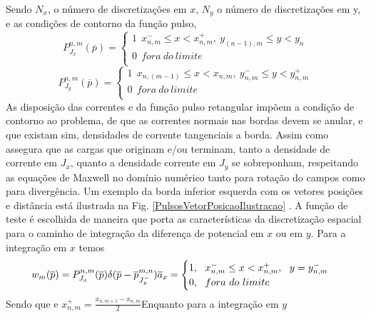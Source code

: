 \documentclass[
	12pt,				%
	openright,			%
	oneside,			%
	a4paper,			%
	english,			%
	brazil				%
	]{abntex2}
\begin{document}
\begin{apendicesenv}
\begin{figure}[htb]
\end{figure}
Sendo $N_x$, o número de discretizações em $x$, $N_y$ o número de discretizações em y, e as condições de contorno da função pulso,
\begin{equation}
     P_{J_x}^{n,m}(\overline{p})=  
     \begin{cases}
      1 \ \ x_{n,m}^{-} \leq x < x_{n,m}^{+},\ y_{(n-1),m} \leq y < y_{n}\\
      0 \ \ fora \ do \ limite \\
    \end{cases}  
\end{equation}
\begin{equation}
     P_{J_y}^{n,m}(\overline{p})=  
     \begin{cases}
      1 \ \  x_{n,(m-1)} \leq x < x_{n,m}, \ y_{n,m}^{-} \leq y < y_{n,m}^{+} \\
      0 \ \ fora \ do \ limite \\
    \end{cases}  
\end{equation}
As disposição das correntes e da função pulso retangular impõem a condição de contorno ao problema, de que as correntes normais nas bordas devem se anular, e que existam sim, densidades de corrente tangenciais a borda. Assim como assegura que as cargas que originam e/ou terminam, tanto a densidade de corrente em $J_x$, quanto a densidade corrente em $J_y$ se sobreponham, respeitando as equações de Maxwell no domínio numérico tanto para rotação do campos como para divergência. Um exemplo da borda inferior esquerda com os vetores posições e distância está ilustrada na Fig. \ref{PulsosVetorPosicaoIlustracao} . A função de teste é escolhida de maneira que porta as características da discretização espacial para o caminho de integração da diferença de potencial em $x$ ou em $y$.  Para a integração em $x$ temos
 \begin{equation}{\label{FunçaoTesteJx}}
     w_{m}(\overline{p})= P_{J_x}^{n,m}(\overline{p})\delta(\overline{p}-\overline{p}^{{m,n}}_{J^{-}_y})\overline{a}_x =
       \begin{cases}
      1, \ \ x_{n,m}^{-} \leq x < x_{n,m}^{+},\ \ y=y_{n,m}^{-}\\
      0, \ \ fora \ do \ limite \\
    \end{cases}  
 \end{equation}
Sendo que e  $x^{+}_{n,m}=\frac{x_{n,m+1}-x_{n,m}}{2}$Enquanto para a integração em $y$


\end{apendicesenv}
\end{document}
